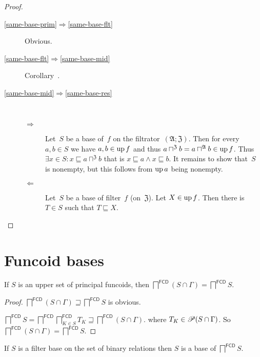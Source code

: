 \begin{proof}
~
\begin{description}
\item[\ref{same-base-prim}$\Rightarrow$\ref{same-base-flt}] Obvious.

\item[\ref{same-base-flt}$\Rightarrow$\ref{same-base-mid}] Corollary~.

\item[\ref{same-base-mid}$\Rightarrow$\ref{same-base-res}] ~
  \begin{description}
  \item[$\Rightarrow$] Let~$S$ be a base of~$f$ on the filtrator~$(\mathfrak{A};\mathfrak{Z})$.
  Then for every $a,b\in S$ we have $a,b\in\operatorname{up} f$ and thus $a\sqcap^{\mathfrak{Z}}b=a\sqcap^{\mathfrak{A}}b\in\operatorname{up} f$.
  Thus $\exists x\in S:x\sqsubseteq a\sqcap^{\mathfrak{Z}}b$ that is $x\sqsubseteq a\land x\sqsubseteq b$.
  It remains to show that~$S$ is nonempty, but this follows from $\operatorname{up} a$ being nonempty.

  \item[$\Leftarrow$] Let~$S$ be a base of filter~$f$ (on~$\mathfrak{Z}$).
  Let $X\in\operatorname{up} f$. Then there is $T\in S$ such that $T\sqsubseteq X$.
  \end{description}
\end{description}
\end{proof}

\section{Funcoid bases}

\begin{lem}
If $S$ is an upper set of principal funcoids, then
$\bigsqcap^{\mathsf{FCD}} (S\cap\Gamma)=\bigsqcap^{\mathsf{FCD}} S$.
\end{lem}

\begin{proof}
  $\bigsqcap^{\mathsf{FCD}} (S\cap\Gamma) \sqsupseteq \bigsqcap^{\mathsf{FCD}} S$ is obvious.
  
  $\bigsqcap^{\mathsf{FCD}} S = \bigsqcap^{\mathsf{FCD}} \bigsqcap^{\mathsf{FCD}}_{K\in S} T_K \sqsupseteq \bigsqcap^{\mathsf{FCD}} (S\cap\Gamma)$.
  where $T_K\in\mathscr{P} (S\cap\Gamma)$.
  So $\bigsqcap^{\mathsf{FCD}} (S\cap\Gamma) = \bigsqcap^{\mathsf{FCD}} S$.
\end{proof}

\begin{thm}
  If $S$ is a filter base on the set of binary relations then $S$ is a base of
  $\bigsqcap^{\mathsf{FCD}} S$.
\end{thm}

